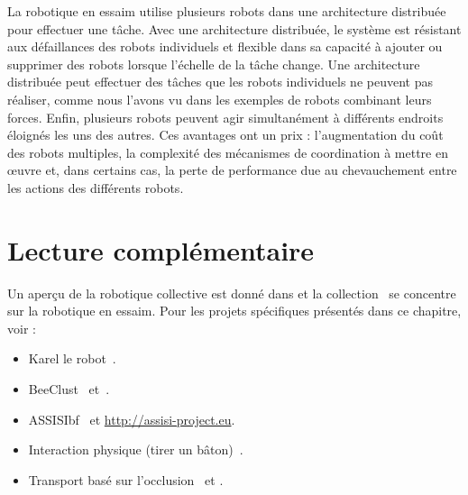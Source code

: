 La robotique en essaim utilise plusieurs robots dans une architecture distribuée pour effectuer une tâche. Avec une architecture distribuée, le système est résistant aux défaillances des robots individuels et flexible dans sa capacité à ajouter ou supprimer des robots lorsque l'échelle de la tâche change. Une architecture distribuée peut effectuer des tâches que les robots individuels ne peuvent pas réaliser, comme nous l'avons vu dans les exemples de robots combinant leurs forces. Enfin, plusieurs robots peuvent agir simultanément à différents endroits éloignés les uns des autres. Ces avantages ont un prix : l'augmentation du coût des robots multiples, la complexité des mécanismes de coordination à mettre en œuvre et, dans certains cas, la perte de performance due au chevauchement entre les actions des différents robots. 


\section{Lecture complémentaire}

Un aperçu de la robotique collective est donné dans \cite{kernbach2013handbook} et la collection~\cite{sahin2005} se concentre sur la robotique en essaim. Pour les projets spécifiques présentés dans ce chapitre, voir :
\begin{itemize}
\item Karel le robot~\cite{karel}.
\item BeeClust~\cite{bodi2012interaction} et~\cite{Schmickl2009}.
\item ASSISIbf~\cite{schmickl2013assisi} et \url{http://assisi-project.eu}.
\item Interaction physique (tirer un bâton)~\cite{Ijspeert2001}.
\item Transport basé sur l'occlusion~\cite{chen2013strategy} et \cite{gross2015}.
\end{itemize}

